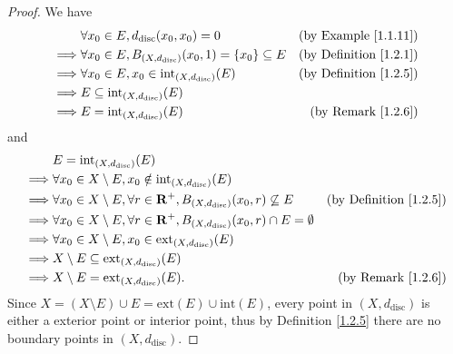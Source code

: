 \begin{proof}
    We have
    \begin{align*}
                 & \forall x_0 \in E, d_{\text{disc}}(x_0, x_0) = 0                          & \text{(by Example \ref{1.1.11})}   \\
        \implies & \forall x_0 \in E, B_{(X, d_{\text{disc}})}(x_0, 1) = \{x_0\} \subseteq E & \text{(by Definition \ref{1.2.1})} \\
        \implies & \forall x_0 \in E, x_0 \in \text{int}_{(X, d_{\text{disc}})}(E)           & \text{(by Definition \ref{1.2.5})} \\
        \implies & E \subseteq \text{int}_{(X, d_{\text{disc}})}(E)                                                               \\
        \implies & E = \text{int}_{(X, d_{\text{disc}})}(E)                                  & \text{(by Remark \ref{1.2.6})}
    \end{align*}
    and
    \begin{align*}
                 & E = \text{int}_{(X, d_{\text{disc}})}(E)                                                                                                            \\
        \implies & \forall x_0 \in X \setminus E, x_0 \notin \text{int}_{(X, d_{\text{disc}})}(E)                                                                      \\
        \implies & \forall x_0 \in X \setminus E, \forall r \in \mathbf{R}^+, B_{(X, d_{\text{disc}})}(x_0, r) \not\subseteq E    & \text{(by Definition \ref{1.2.5})} \\
        \implies & \forall x_0 \in X \setminus E, \forall r \in \mathbf{R}^+, B_{(X, d_{\text{disc}})}(x_0, r) \cap E = \emptyset                                      \\
        \implies & \forall x_0 \in X \setminus E, x_0 \in \text{ext}_{(X, d_{\text{disc}})}(E)                                                                         \\
        \implies & X \setminus E \subseteq \text{ext}_{(X, d_{\text{disc}})}(E)                                                                                        \\
        \implies & X \setminus E = \text{ext}_{(X, d_{\text{disc}})}(E).                                                          & \text{(by Remark \ref{1.2.6})}
    \end{align*}
    Since \(X = (X \setminus E) \cup E = \text{ext}(E) \cup \text{int}(E)\), every point in \((X, d_{\text{disc}})\) is either a exterior point or interior point, thus by Definition \ref{1.2.5} there are no boundary points in \((X, d_{\text{disc}})\).
\end{proof}


